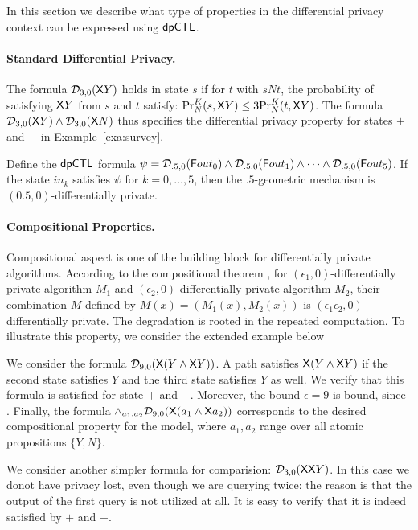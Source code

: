 In this section we describe what type of properties in the differential privacy context can be expressed using $\dpCTL$.

\paragraph{Standard Differential Privacy.}
The formula $\dpriv{3}{0} (\X Y)$ holds in state $s$ if for  $t$ with $sNt$, the probability of satisfying $\X Y$ from $s$ and $t$ satisfy:
$\myPr{s}{K}{N}{\X Y}\le 3\myPr{t}{K}{N}{\X Y}$. The formula $\dpriv{3}{0} (\X Y)\wedge \dpriv{3}{0} (\X N)$ thus specifies the differential privacy property for states $+$ and $-$ in Example~\ref{exa:survey}.

 Define the $\dpCTL$ formula
$\psi = \dpriv{.5}{0} (\F out_0) \wedge \dpriv{.5}{0} (\F out_1) \wedge
\cdots \wedge \dpriv{.5}{0} (\F out_5)$. If the state $in_k$ satisfies
$\psi$ for $k = 0, \ldots, 5$, then the $.5$-geometric mechanism is
$(0.5, 0)$-differentially private.


\paragraph{Compositional Properties.}
Compositional aspect is one of the building block for differentially private algorithms. According to the compositional theorem \cite{}, for $(\epsilon_1,0)$-differentially private algorithm $M_1$ and
$(\epsilon_2,0)$-differentially private algorithm $M_2$, their combination $M$ defined by $M(x)=(M_1(x), M_2(x))$ is $(\epsilon_1\epsilon_2,0)$-differentially private. The degradation is rooted in the repeated computation. To illustrate this property, we consider the extended example below 

We consider the formula $\dpriv{9}{0} (\X (Y\wedge \X Y))$. A path satisfies $\X (Y\wedge \X Y)$ if the second state satisfies $Y$ and the third state satisfies $Y$ as well. We verify that this formula is satisfied  for state $+$ and $-$. Moreover, the bound $\epsilon=9$ is bound, since . Finally, the formula $\wedge_{a_1,a_2}\dpriv{9}{0} (\X (a_1\wedge \X a_2))$ corresponds to the desired compositional property for the model, where $a_1,a_2$ range over all atomic propositions $\{Y,N\}$.

We consider another simpler formula for comparision: $\dpriv{3}{0} (\X \X Y)$. In this case we donot have privacy lost, even though we are querying twice: the reason is that the output of the first query is not utilized at all. It is easy to verify that it is indeed satisfied by $+$ and $-$.


